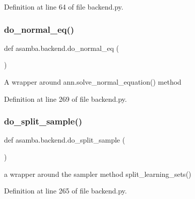 Definition at line 64 of file backend.\+py.

\mbox{\label{namespaceasamba_1_1backend_aae574ec8e5b56784a17eac85f49b9ff6}} 
\subsubsection{\texorpdfstring{do\+\_\+normal\+\_\+eq()}{do\_normal\_eq()}}
{\footnotesize\ttfamily def asamba.\+backend.\+do\+\_\+normal\+\_\+eq (\begin{DoxyParamCaption}{ }\end{DoxyParamCaption})}

\begin{DoxyVerb}A wrapper around ann.solve_normal_equation() method \end{DoxyVerb}
 

Definition at line 269 of file backend.\+py.

\mbox{\label{namespaceasamba_1_1backend_a7991be555fc395ba6753a5d18976c0f0}} 
\subsubsection{\texorpdfstring{do\+\_\+split\+\_\+sample()}{do\_split\_sample()}}
{\footnotesize\ttfamily def asamba.\+backend.\+do\+\_\+split\+\_\+sample (\begin{DoxyParamCaption}{ }\end{DoxyParamCaption})}

\begin{DoxyVerb}a wrapper around the sampler method split_learning_sets() \end{DoxyVerb}
 

Definition at line 265 of file backend.\+py.

\mbox{\label{namespaceasamba_1_1backend_a5cc5719b5de5aadd02843c5746a10313}} 
